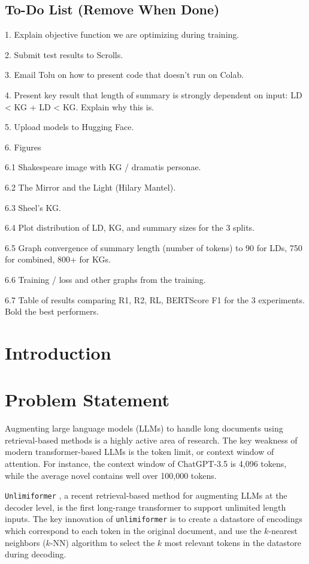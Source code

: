\documentclass[12pt]{article}
\begin{document}

\subsection*{To-Do List (Remove When Done)}
1. Explain objective function we are optimizing during training.

2. Submit test results to Scrolls.

3. Email Tolu on how to present code that doesn't run on Colab.

4. Present key result that length of summary is strongly dependent on input: LD < KG + LD < KG. Explain why this is.

5. Upload models to Hugging Face.

6. Figures

6.1 Shakespeare image with KG / dramatis personae.

6.2 The Mirror and the Light (Hilary Mantel).

6.3 Sheel's KG.

6.4 Plot distribution of LD, KG, and summary sizes for the 3 splits.

6.5 Graph convergence of summary length (number of tokens) to 90 for LDs, 750 for combined, 800+ for KGs.

6.6 Training / loss and other graphs from the training.

6.7 Table of results comparing R1, R2, RL, BERTScore F1 for the 3 experiments. Bold the best performers.

\section{Introduction}

\section{Problem Statement}
Augmenting large language models (LLMs) to handle long documents using retrieval-based methods is a highly active area of research. The key weakness of modern transformer-based LLMs is the token limit, or context window of attention. For instance, the context window of ChatGPT-3.5 is 4,096 tokens, while the average novel contains well over 100,000 tokens.

\texttt{Unlimiformer} \cite{bertsch2023unlimiformer}, a recent retrieval-based method for augmenting LLMs at the decoder level, is the first long-range transformer to support unlimited length inputs. The key innovation of \texttt{unlimiformer} is to create a datastore of encodings which correspond to each token in the original document, and use the $k$-nearest neighbors ($k$-NN) algorithm to select the $k$ most relevant tokens in the datastore during decoding.
\end{document}
